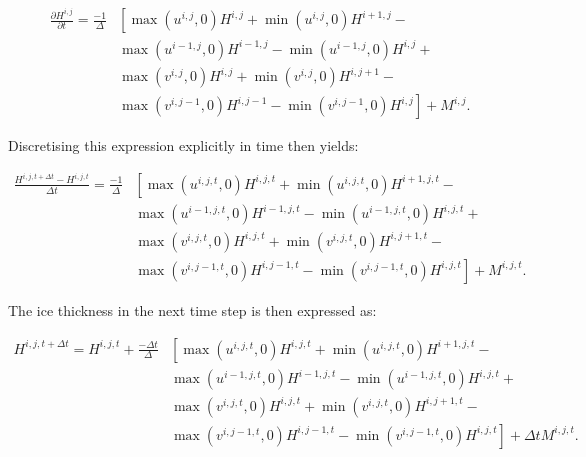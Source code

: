 \documentclass{article}
\begin{document}
\begin{equation} \label{eq:thickness_03}
\begin{split}
\frac{\partial H^{i,j}}{\partial t} = \frac{-1}{\Delta} & \left[ 
\max \left( u^{i,j},0 \right) H^{i,j} + \min \left( u^{i,j},0 \right) H^{i+1,j} \right. - \\
& \left. \max \left( u^{i-1,j},0 \right) H^{i-1,j} - \min \left( u^{i-1,j},0 \right) H^{i,j} \right. + \\
& \left. \max \left( v^{i,j},0 \right) H^{i,j} + \min \left( v^{i,j},0 \right) H^{i,j+1} \right. - \\
& \left. \max \left( v^{i,j-1},0 \right) H^{i,j-1} - \min \left( v^{i,j-1},0 \right) H^{i,j} \right]
+ M^{i,j}.
\end{split}
\end{equation}

Discretising this expression explicitly in time then yields:

\begin{equation} \label{eq:thickness_04}
\begin{split}
\frac{H^{i,j,t+\Delta t} - H^{i,j,t}}{\Delta t} = \frac{-1}{\Delta} & \left[ 
\max \left( u^{i,j,t},0 \right) H^{i,j,t} + \min \left( u^{i,j,t},0 \right) H^{i+1,j,t} \right. - \\
& \left. \max \left( u^{i-1,j,t},0 \right) H^{i-1,j,t} - \min \left( u^{i-1,j,t},0 \right) H^{i,j,t} \right. + \\
& \left. \max \left( v^{i,j,t},0 \right) H^{i,j,t} + \min \left( v^{i,j,t},0 \right) H^{i,j+1,t} \right. - \\
& \left. \max \left( v^{i,j-1,t},0 \right) H^{i,j-1,t} - \min \left( v^{i,j-1,t},0 \right) H^{i,j,t} \right]
+ M^{i,j,t}.
\end{split}
\end{equation}

The ice thickness in the next time step is then expressed as:

\begin{equation} \label{eq:thickness_05}
\begin{split}
H^{i,j,t+\Delta t} = H^{i,j,t} + \frac{-\Delta t}{\Delta} & \left[ 
\max \left( u^{i,j,t},0 \right) H^{i,j,t} + \min \left( u^{i,j,t},0 \right) H^{i+1,j,t} \right. - \\
& \left. \max \left( u^{i-1,j,t},0 \right) H^{i-1,j,t} - \min \left( u^{i-1,j,t},0 \right) H^{i,j,t} \right. + \\
& \left. \max \left( v^{i,j,t},0 \right) H^{i,j,t} + \min \left( v^{i,j,t},0 \right) H^{i,j+1,t} \right. - \\
& \left. \max \left( v^{i,j-1,t},0 \right) H^{i,j-1,t} - \min \left( v^{i,j-1,t},0 \right) H^{i,j,t} \right]
+ \Delta t M^{i,j,t}.
\end{split}
\end{equation}
\end{document}
